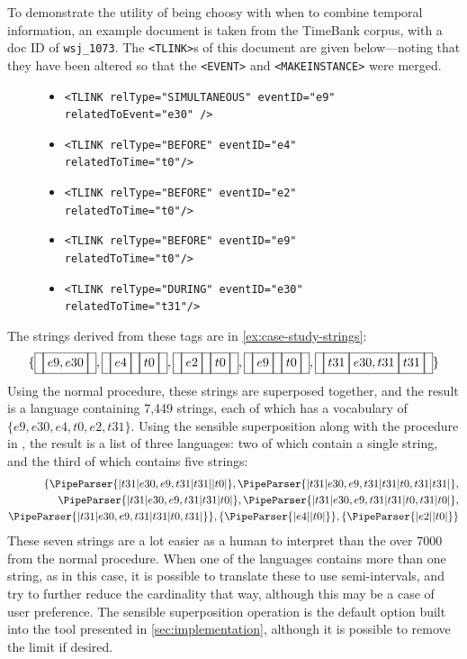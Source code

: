 \documentclass[a4paper,12pt,leqno,twoside]{article}
\newcommand{\vph}[1]{\vphantom{#1}}
\newcommand{\ebox}[1]{\fbox{$\vph{'(),}#1$}}
\newcommand{\nbBefore}[2]{\ebox{#1}\ebox{}\ebox{#2}}
\newcommand{\nbDuring}[2]{\ebox{#2}\ebox{#1,#2}\ebox{#2}}
\newcommand{\nbEquals}[2]{\ebox{#1,#2}}
\newcommand{\Before}[2]{\ebox{}\nbBefore{#1}{#2}\ebox{}}
\newcommand{\During}[2]{\ebox{}\nbDuring{#1}{#2}\ebox{}}
\newcommand{\Equals}[2]{\ebox{}\nbEquals{#1}{#2}\ebox{}}
\newcommand{\EventString}[1]{%
	\renewcommand*{\do}[1]{\ebox{##1}}%
	\PipeParser{#1}%
}
\begin{document}
To demonstrate the utility of being choosy with when to combine temporal information, an example document is taken from the TimeBank corpus, with a doc ID of \verb|wsj_1073|. The \verb|<TLINK>|s of this document are given below---noting that they have been altered so that the \verb|<EVENT>| and \verb|<MAKEINSTANCE>| were merged.
\begin{center}
	\begin{figure}[h!]
		\begin{itemize}
			\item[] \verb|<TLINK relType="SIMULTANEOUS" eventID="e9" relatedToEvent="e30" />|
			\item[] \verb|<TLINK relType="BEFORE" eventID="e4" relatedToTime="t0"/>|
			\item[] \verb|<TLINK relType="BEFORE" eventID="e2" relatedToTime="t0"/>|
			\item[] \verb|<TLINK relType="BEFORE" eventID="e9" relatedToTime="t0"/>|
			\item[] \verb|<TLINK relType="DURING" eventID="e30" relatedToTime="t31"/>|
		\end{itemize}
	\end{figure}
	\label{fig:case-study-tlinks}
\end{center}
The strings derived from these tags are in \cref{ex:case-study-strings}:
\begin{align}
	\{\Equals{e9}{e30}, \Before{e4}{t0}, \Before{e2}{t0}, \Before{e9}{t0}, \During{e30}{t31}\}\label{ex:case-study-strings}
\end{align}
Using the normal procedure, these strings are superposed together, and the result is a language containing 7,449 strings, each of which has a vocabulary of $\{e9,e30,e4,t0,e2,t31\}$. Using the sensible superposition along with the procedure in , the result is a list of three languages: two of which contain a single string, and the third of which contains five strings:
\begin{align}
	\{\EventString{{}|t31|e30,e9,t31|t31|{}|t0|{}}, \EventString{{}|t31|e30,e9,t31|t31|t0,t31|t31|{}},\label{ex:sp-sens-result}\\
	\EventString{{}|t31|e30,e9,t31|t31|t0|{}}, \EventString{{}|t31|e30,e9,t31|t31|t0,t31|t0|{}},\notag\\
	\EventString{{}|t31|e30,e9,t31|t31|t0,t31|{}}\}, \{\EventString{{}|e4|{}|t0|{}}\}, \{\EventString{{}|e2|{}|t0|{}}\}\notag
\end{align}
These seven strings are a lot easier as a human to interpret than the over 7000 from the normal procedure. When one of the languages contains more than one string, as in this case, it is possible to translate these to use semi-intervals, and try to further reduce the cardinality that way, although this may be a case of user preference. The sensible superposition operation is the default option built into the tool presented in \cref{sec:implementation}, although it is possible to remove the limit if desired.
\end{document}
